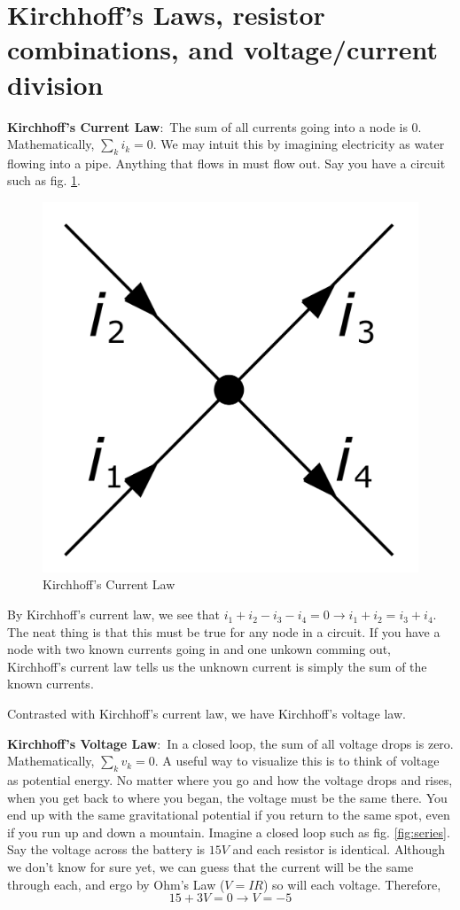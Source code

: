 \documentclass[nobib]{tufte-handout}
\newcommand{\defn}[2]{\noindent\textbf{#1}:\ #2}
\begin{document}
\section{Kirchhoff's Laws, resistor combinations, and voltage/current division}
\defn{Kirchhoff's Current Law}{The sum of all currents going into
a node is 0. Mathematically, $\sum_k i_k = 0$}. We may intuit 
this by imagining electricity as water flowing into a pipe. Anything that flows 
in must flow out.
Say you have a circuit such as fig. \ref{fig:kcl}. 
\begin{figure}
    \center
    \includegraphics[width=\textwidth/2]{images/1200px-Kirchhoff's_Current_Law.svg.png}
    \caption{Kirchhoff's Current Law}
    \label{fig:kcl}
\end{figure}
By Kirchhoff's
current law, we see that $i_1+i_2-i_3-i_4 = 0 \rightarrow i_1 + i_2 = i_3 +i_4$.
The neat thing is that this must be true for any node in a circuit. 
If you have a node with two known currents going in and one unkown comming out,
Kirchhoff's current law tells us the unknown current is simply the sum
of the known currents. 

Contrasted with Kirchhoff's current law, we have Kirchhoff's voltage
law. 

\defn{Kirchhoff's Voltage Law}{In a closed loop, the sum
of all voltage drops is zero. Mathematically, $\sum_k v_k = 0$}.
A useful way to visualize this is to think of voltage as potential energy.
No matter where you go and how the voltage drops and rises, 
when you get back to where you began, the voltage must be the same
there. You end up with the same gravitational potential if
you return to the same spot, even if you run up and down a mountain.
Imagine a closed loop such as fig. \ref{fig:series}.
Say the voltage across the battery is $15V$ and each resistor
is identical. Although we don't know for sure yet, we can guess
that the current will be the same through each, and ergo
by Ohm's Law ($V=IR$) so will each voltage. Therefore,
\[15 + 3V = 0 \rightarrow V = -5\]
\end{document}
